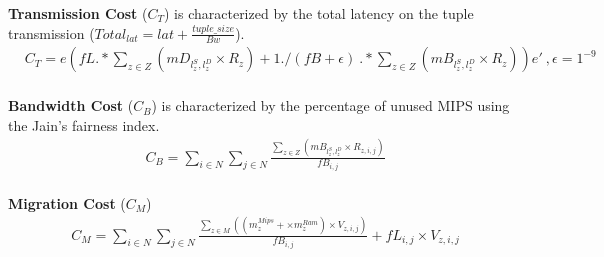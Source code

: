 \documentclass{article}
\begin{document}
\noindent\textbf{Transmission Cost} ($C_T$) is characterized by the total latency on the tuple transmission ($Total_{lat}=lat + \frac{tuple\_size}{Bw}$).\\[6pt]
\begin{equation*}
\begin{aligned}
& C_T = e \left(fL .* \sum_{z\in Z} \left( mD_{l^S_z,l^D_z} \times R_z \right) + 1./(fB + \epsilon)~.* \sum_{z\in Z} \left( mB_{l^S_z,l^D_z} \times R_z\right)\right) e' ~, \epsilon = 1^{-9}
\end{aligned}
\end{equation*}\\[6pt]

\noindent\textbf{Bandwidth Cost} ($C_B$) is characterized by the percentage of unused MIPS using the Jain's fairness index.\\[6pt]
\begin{equation*}
\begin{split}
& C_B = \sum_{i\in N}\sum_{j\in N} \frac{\sum_{z\in Z}\left( mB_{l^S_z,l^D_z} \times R_{z, i,j} \right)}{fB_{i,j}}
\end{split}
\end{equation*}\\[6pt]

\noindent\textbf{Migration Cost} ($C_M$)\\[6pt]
\begin{equation*}
\begin{split}
& C_M = \sum_{i\in N}\sum_{j\in N} \frac{\sum_{z\in M}\left(\left(m^{Mips}_{z} + \times m^{Ram}_{z}\right) \times V_{z, i,j} \right)}{fB_{i,j}} + fL_{i,j}\times V_{z, i,j}
\end{split}
\end{equation*}\\[6pt]
\end{document}
